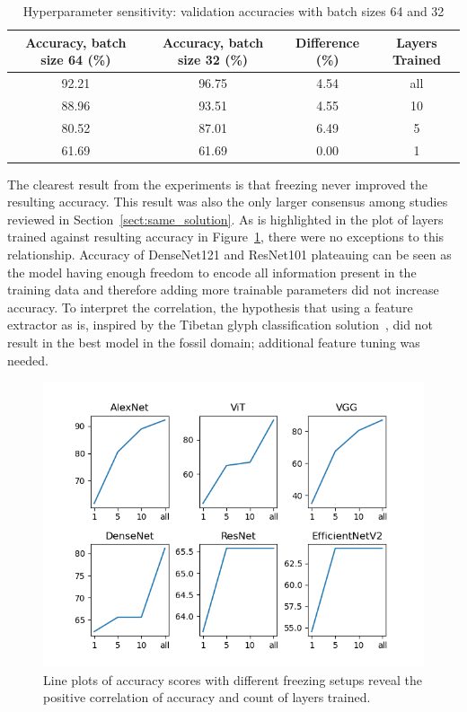 \documentclass[english,twoside,openright]{UH_DS_MSc}
\begin{document}
\begin{table}[ht]
    \centering
        \scriptsize
        \begin{tabular}{|c|c|c|c|}
            \hline
            \textbf{Accuracy, batch size 64 (\%)} & \textbf{Accuracy, batch size 32 (\%)} & \textbf{Difference} (\%) & \textbf{Layers Trained} \\ \hline
            92.21 & 96.75 & 4.54 & all \\\hline
            88.96 & 93.51 & 4.55 & 10  \\\hline
            80.52 & 87.01 & 6.49 & 5   \\\hline
            61.69 & 61.69 & 0.00 & 1   \\\hline
        \end{tabular}
    \caption{Hyperparameter sensitivity: validation accuracies with batch sizes 64 and 32}
    \label{table:hyperparameter_sensitivity}
\end{table}

The clearest result from the experiments is that freezing never improved the resulting accuracy. This result was 
also the only larger consensus among studies reviewed in Section~\ref{sect:same_solution}.
As is highlighted in the plot of layers trained against resulting accuracy in Figure~\ref{image:accuracy_vs_freezing},
there were no exceptions to this relationship. Accuracy of DenseNet121 and ResNet101 plateauing can be seen as 
the model having enough freedom to encode all information present in the training data and therefore adding 
more trainable parameters did not increase accuracy. To interpret the correlation, the hypothesis that using a feature 
extractor as is, inspired by the Tibetan glyph classification solution~\cite{4zhaoTibetan}, did not result in the 
best model in the fossil domain; additional feature tuning was needed.

\begin{figure}[ht]
    \centering
    \includegraphics*[scale=0.8]{images/accuracy_against_freezing.png}
    \caption{Line plots of accuracy scores with different freezing setups reveal the positive correlation of accuracy and count of layers trained.}
    \label{image:accuracy_vs_freezing}
\end{figure}
\end{document}

